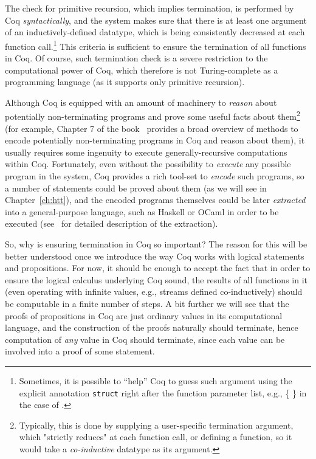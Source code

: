 The check for primitive recursion, which implies termination, is
performed by Coq \textit{syntactically}, and the system makes sure that there
is at least one argument of an inductively-defined datatype, which is
being consistently decreased at each function
call.\footnote{Sometimes, it is possible to ``help'' Coq to guess
such argument using the explicit annotation \texttt{struct} right
after the function parameter list, e.g., \{ \} in the case of
.} This criteria is sufficient to ensure the termination
of all functions in Coq. Of course, such termination check is a severe
restriction to the computational power of Coq, which therefore is not
Turing-complete as a programming language (as it supports only
primitive recursion).


Although Coq is equipped with an amount of machinery to \textit{reason} about
potentially non-terminating programs and prove some useful facts about
them\footnote{Typically, this is done by supplying a user-specific
termination argument, which "strictly reduces" at each function call,
or defining a function, so it would take a \emph{co-inductive}
datatype as its argument.} (for example, Chapter 7 of the
book~\cite{Chlipala:BOOK} provides a broad overview of methods to
encode potentially non-terminating programs in Coq and reason about
them), it usually requires some ingenuity to execute
generally-recursive computations within Coq. Fortunately, even without
the possibility to \textit{execute} any possible program in the system, Coq
provides a rich tool-set to \textit{encode} such programs, so a number of
statements could be proved about them (as we will see in
Chapter~\ref{ch:htt}), and the encoded programs themselves could be
later \textit{extracted} into a general-purpose language, such as Haskell or
OCaml in order to be executed (see~\cite[Chapter
10]{Bertot-Casteran:BOOK} for detailed description of the
extraction).


So, why is ensuring termination in Coq so important? The reason for
this will be better understood once we introduce the way Coq works
with logical statements and propositions. For now, it should be enough
to accept the fact that in order to ensure the logical calculus
underlying Coq sound, the results of all functions in it (even
operating with infinite values, e.g., streams defined co-inductively)
should be computable in a finite number of steps. A bit further we
will see that the proofs of propositions in Coq are just ordinary
values in its computational language, and the construction of the
proofs naturally should terminate, hence computation of \textit{any} value in
Coq should terminate, since each value can be involved into a proof of
some statement.


